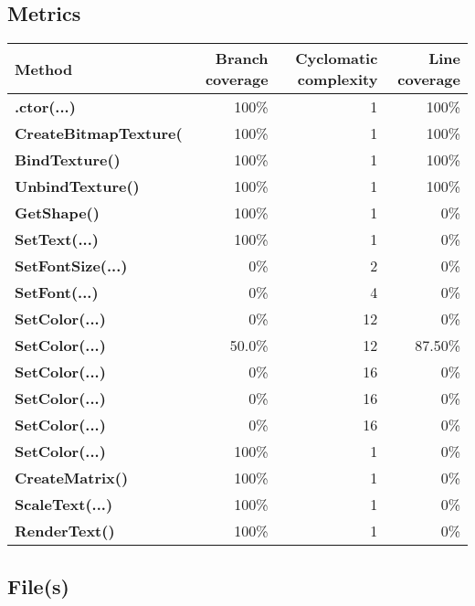 \documentclass[a4paper,landscape,10pt]{article}
\begin{document}
\subsection{Metrics}
\begin{longtable}[l]{|l|r|r|r|}
\hline
\textbf{Method} & \textbf{Branch coverage} & \textbf{Cyclomatic complexity} & \textbf{Line coverage}\\
\hline
\textbf{.ctor(...)} & 100\% & 1 & 100\%\\
\hline
\textbf{CreateBitmapTexture(} & 100\% & 1 & 100\%\\
\hline
\textbf{BindTexture()} & 100\% & 1 & 100\%\\
\hline
\textbf{UnbindTexture()} & 100\% & 1 & 100\%\\
\hline
\textbf{GetShape()} & 100\% & 1 & 0\%\\
\hline
\textbf{SetText(...)} & 100\% & 1 & 0\%\\
\hline
\textbf{SetFontSize(...)} & 0\% & 2 & 0\%\\
\hline
\textbf{SetFont(...)} & 0\% & 4 & 0\%\\
\hline
\textbf{SetColor(...)} & 0\% & 12 & 0\%\\
\hline
\textbf{SetColor(...)} & 50.0\% & 12 & 87.50\%\\
\hline
\textbf{SetColor(...)} & 0\% & 16 & 0\%\\
\hline
\textbf{SetColor(...)} & 0\% & 16 & 0\%\\
\hline
\textbf{SetColor(...)} & 0\% & 16 & 0\%\\
\hline
\textbf{SetColor(...)} & 100\% & 1 & 0\%\\
\hline
\textbf{CreateMatrix()} & 100\% & 1 & 0\%\\
\hline
\textbf{ScaleText(...)} & 100\% & 1 & 0\%\\
\hline
\textbf{RenderText()} & 100\% & 1 & 0\%\\
\hline
\end{longtable}
\subsection{File(s)}
\end{document}
